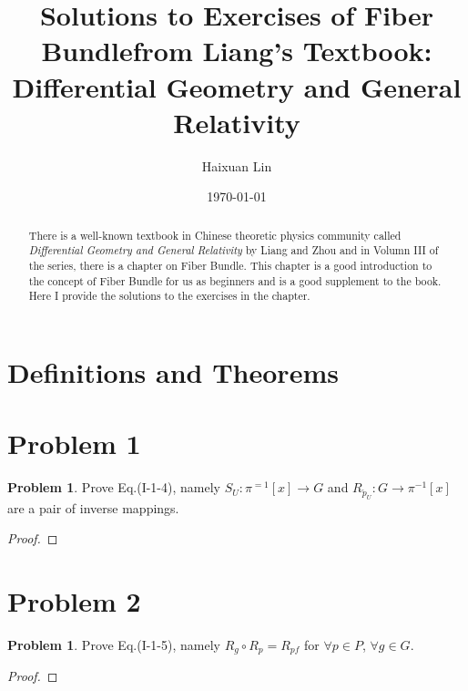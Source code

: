 \documentclass[11pt]{amsart}
\title{Solutions to Exercises of Fiber Bundlefrom Liang's Textbook: Differential Geometry and General Relativity}
\author{Haixuan Lin}
\date{\today}
\theoremstyle{definition}
\newtheorem{problem}[theorem]{Problem}
\theoremstyle{remark}
\begin{document}
\begin{abstract}
  There is a well-known textbook in Chinese theoretic physics community called \emph{Differential Geometry and General Relativity} by Liang and Zhou \cite{liang2009differential} and in Volumn III of the series, there is a chapter on Fiber Bundle. This chapter is a good introduction to the concept of Fiber Bundle for us as beginners and is a good supplement to the book. Here I provide the solutions to the exercises in the chapter.
\end{abstract}

\maketitle

\section{Definitions and Theorems}







\section{Problem 1}

\begin{problem}
  Prove Eq.(I-1-4), namely $S_U:\pi ^{=1}\left[ x \right] \rightarrow G$ and $R_{\breve{p}_U}:G\rightarrow \pi ^{-1}\left[ x \right]$ are a pair of inverse mappings.
\end{problem}
\begin{proof}
  
\end{proof}

\section{Problem 2}

\begin{problem}
  Prove Eq.(I-1-5), namely $R_g\circ R_p=R_{pf}$ for $\forall p\in P$, $\forall g\in G$.
\end{problem}
\begin{proof}
  
\end{proof}


\nocite{*}


\end{document}
